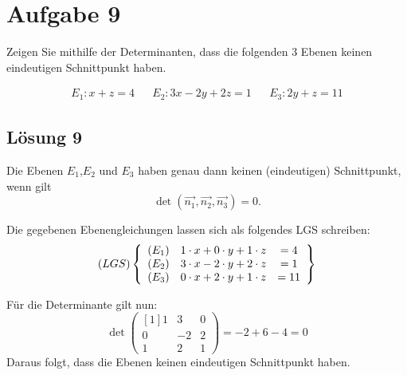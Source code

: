 \documentclass[main.tex]{subfiles}
\begin{document}
\section{Aufgabe 9}

Zeigen Sie mithilfe der Determinanten, dass die folgenden 3 Ebenen keinen eindeutigen Schnittpunkt haben.

\begin{align*}
    E_1: x+z=4 & & E_2: 3x-2y+2z = 1 & & E_3 : 2y+z=11
\end{align*}

\subsection{Lösung 9}

Die Ebenen $E_{1}$,$E_{2}$ und $E_{3}$ haben genau dann keinen (eindeutigen) Schnittpunkt, wenn gilt
\begin{equation*}
    \det\left(\overrightarrow{n_{1}} ,\overrightarrow{n_{2}} ,\overrightarrow{n_{3}}\right) =0\text{.}
\end{equation*}

Die gegebenen Ebenengleichungen lassen sich als folgendes LGS schreiben:
\begin{equation*}
    ( LGS)\left\{\begin{array}{ c l c }
    ( E_{1}) & 1\cdotp x+0\cdotp y+1\cdotp z & =4\\
    ( E_{2}) & 3\cdotp x-2\cdotp y+2\cdotp z & =1\\
    ( E_{3}) & 0\cdotp x+2\cdotp y+1\cdotp z & =11
    \end{array}\right\}
\end{equation*}

Für die Determinante gilt nun:
\begin{equation*}
    \det\begin{pmatrix}[1]
    1 & 3 & 0\\
    0 & -2 & 2\\
    1 & 2 & 1
    \end{pmatrix} =-2+6-4=0
\end{equation*}
Daraus folgt, dass die Ebenen keinen eindeutigen Schnittpunkt haben.
\end{document}
